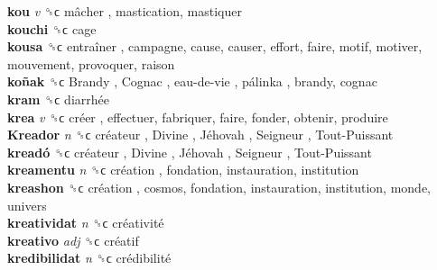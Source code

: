 \textbf{kou} \emph{v}  ␝ϲ   mâcher , mastication, mastiquer  \\
\textbf{kouchi} ␝ϲ  cage  \\
\textbf{kousa} ␝ϲ   entraîner , campagne, cause, causer, effort, faire, motif, motiver, mouvement, provoquer, raison  \\
\textbf{koñak} ␝ϲ   Brandy ,  Cognac ,  eau-de-vie ,  pálinka , brandy, cognac  \\
\textbf{kram} ␝ϲ   diarrhée   \\
\textbf{krea} \emph{v}  ␝ϲ   créer , effectuer, fabriquer, faire, fonder, obtenir, produire  \\
\textbf{Kreador} \emph{n}  ␝ϲ   créateur ,  Divine ,  Jéhovah ,  Seigneur ,  Tout-Puissant   \\
\textbf{kreadó} ␝ϲ   créateur ,  Divine ,  Jéhovah ,  Seigneur ,  Tout-Puissant   \\
\textbf{kreamentu} \emph{n}  ␝ϲ   création , fondation, instauration, institution  \\
\textbf{kreashon} ␝ϲ   création , cosmos, fondation, instauration, institution, monde, univers  \\
\textbf{kreatividat} \emph{n}  ␝ϲ   créativité   \\
\textbf{kreativo} \emph{adj}  ␝ϲ   créatif   \\
\textbf{kredibilidat} \emph{n}  ␝ϲ   crédibilité   \\
